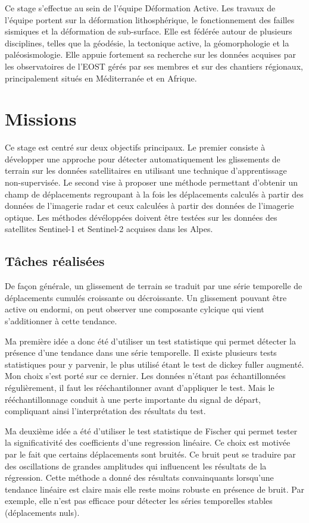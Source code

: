 \documentclass[11pt, openany]{report}
\begin{document}
Ce stage s'effectue au sein de l'équipe Déformation Active. Les travaux de l'équipe portent sur la déformation lithosphérique, le fonctionnement des failles sismiques et la déformation de sub-surface. Elle est fédérée autour de plusieurs disciplines, telles que la géodésie, la tectonique active, la géomorphologie et la paléosismologie. Elle appuie fortement sa recherche sur les données acquises par les observatoires de l'EOST gérés par ses membres et sur des chantiers régionaux, principalement situés en Méditerranée et en Afrique.

\chapter{Missions}
Ce stage est centré sur deux objectifs principaux. Le premier consiste à développer une approche pour détecter automatiquement les glissements de terrain sur les données satellitaires en utilisant une technique d'apprentissage non-supervisée. Le second vise à proposer une méthode permettant d'obtenir un champ de déplacements regroupant à la fois les déplacements calculés à partir des données de l'imagerie radar et ceux  calculées à partir des données de l'imagerie optique. Les méthodes dévéloppées doivent être testées sur les données des satellites Sentinel-1 et Sentinel-2 acquises dans les Alpes.
\section{Tâches réalisées}
De façon générale, un glissement de terrain se traduit par une série temporelle de déplacements cumulés croissante ou décroissante. Un glissement pouvant être active ou endormi, on peut observer une composante cylcique qui vient s'additionner à cette tendance.

Ma première idée a donc été d'utiliser un test statistique qui permet détecter la présence d'une tendance dans une série temporelle. Il existe plusieurs tests statistiques pour y parvenir, le plus utilisé étant le test de dickey fuller augmenté. Mon choix s'est porté sur ce dernier. Les données n'étant pas échantillonnées régulièrement, il faut les rééchantilonner avant d'appliquer le test. Mais le rééchantillonnage conduit à une perte importante du signal de départ, compliquant ainsi l'interprétation des résultats du test. 

Ma deuxième idée a été d'utiliser le test statistique de Fischer qui permet tester la significativité des coefficients d'une regression linéaire. Ce choix est motivée par le fait que certains déplacements sont bruités. Ce bruit peut se traduire par des oscillations de grandes amplitudes qui influencent les résultats de la régression. Cette méthode a donné des résultats convainquants lorsqu'une tendance linéaire est claire mais elle reste moins robuste en présence de bruit. Par exemple, elle n'est pas efficace pour détecter les séries temporelles stables (déplacements nuls).
\end{document}
